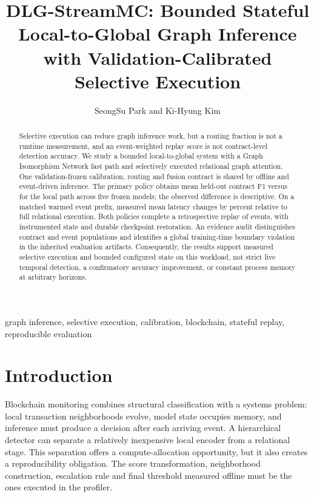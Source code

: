 \documentclass[10pt,journal]{IEEEtran}
\title{DLG-StreamMC: Bounded Stateful Local-to-Global Graph Inference with Validation-Calibrated Selective Execution}
\author{SeongSu Park and Ki-Hyung Kim}
\begin{document}
\maketitle
\begin{abstract}
Selective execution can reduce graph inference work, but a routing fraction is not a runtime measurement, and an event-weighted replay score is not contract-level detection accuracy. We study a bounded local-to-global system with a Graph Isomorphism Network fast path and selectively executed relational graph attention. One validation-frozen calibration, routing and fusion contract is shared by offline and event-driven inference. The primary policy obtains mean held-out contract F1 \PrimaryFOne{} versus \LocalFOne{} for the local path across five frozen models; the observed difference is descriptive. On a matched warmed event prefix, measured mean latency changes by \LatencyReduction{} percent relative to full relational execution. Both policies complete a retrospective replay of \StreamEvents{} events, with instrumented state and durable checkpoint restoration. An evidence audit distinguishes contract and event populations and identifies a global training-time boundary violation in the inherited evaluation artifacts. Consequently, the results support measured selective execution and bounded configured state on this workload, not strict live temporal detection, a confirmatory accuracy improvement, or constant process memory at arbitrary horizons.
\end{abstract}
\begin{IEEEkeywords}graph inference, selective execution, calibration, blockchain, stateful replay, reproducible evaluation\end{IEEEkeywords}

\section{Introduction}
Blockchain monitoring combines structural classification with a systems problem: local transaction neighborhoods evolve, model state occupies memory, and inference must produce a decision after each arriving event. A hierarchical detector can separate a relatively inexpensive local encoder from a relational stage. This separation offers a compute-allocation opportunity, but it also creates a reproducibility obligation. The score transformation, neighborhood construction, escalation rule and final threshold measured offline must be the ones executed in the profiler.
\end{document}
